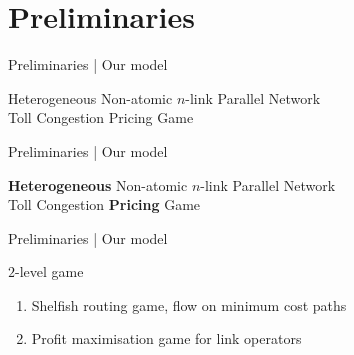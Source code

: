 \documentclass[handout]{beamer}
\begin{document}
\section{Preliminaries}

\begin{frame}{Preliminaries | Our model}
	\begin{center}
		Heterogeneous Non-atomic $n$-link Parallel Network\\
		Toll Congestion Pricing Game
	\end{center}
\end{frame}
\begin{frame}{Preliminaries | Our model}
	\begin{center}
		\textbf{Heterogeneous} Non-atomic $n$-link Parallel Network\\
		Toll Congestion \textbf{Pricing} Game
	\end{center}
\end{frame}

\begin{frame}{Preliminaries | Our model}
	\;
	\begin{block}{$2$-level game}
		\begin{enumerate}
			\item Shelfish routing game, flow on minimum cost paths
			\item Profit maximisation game for link operators
		\end{enumerate}
	\end{block}
\end{frame}
\end{document}
